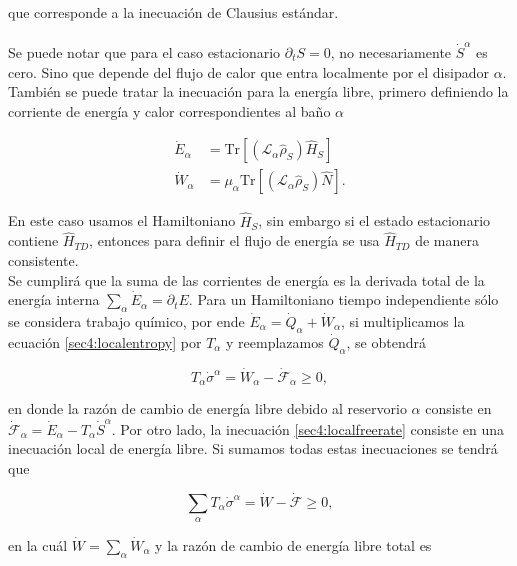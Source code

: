 que corresponde a la inecuación de Clausius estándar.\\
\\
Se puede notar que para el caso estacionario $\partial_{t}S = 0$, no necesariamente $\dot{S}^{\alpha}$ es cero. Sino que depende del flujo de calor que entra localmente por el disipador $\alpha$. También se puede tratar la inecuación para la energía libre, primero definiendo la corriente de energía y calor correspondientes al baño $\alpha$

\begin{align*}
    \dot{E}_{\alpha} & = \text{Tr}[ (\mathcal{L}_{\alpha} \hat{\rho}_{S}) \hat{H}_{S}] \\
    \dot{W}_{\alpha} & = \mu_{\alpha}\text{Tr}[ (\mathcal{L}_{\alpha} \hat{\rho}_{S}) \hat{N}].
\end{align*}

En este caso usamos el Hamiltoniano $\hat{H}_{S}$, sin embargo si el estado estacionario contiene $\hat{H}_{TD}$, entonces para definir el flujo de energía se usa $\hat{H}_{TD}$ de manera consistente.\\
 Se cumplirá que la suma de las corrientes de energía es la derivada total de la energía interna $\sum_{\alpha} \dot{E}_{\alpha} = \partial_{t}E$. Para un Hamiltoniano tiempo independiente sólo se considera trabajo químico, por ende $\dot{E}_{\alpha} = \dot{Q}_{\alpha} + \dot{W}_{\alpha}$, si multiplicamos la ecuación \ref{sec4:localentropy} por $T_{\alpha}$ y reemplazamos $\dot{Q}_{\alpha}$, se obtendrá

\begin{equation}
    T_{\alpha} \dot{\sigma}^{\alpha} = \dot{W}_{\alpha} - \dot{\mathcal{F}}_{\alpha} \geq 0,
\label{sec4:localfreerate}
\end{equation}

en donde la razón de cambio de energía libre debido al reservorio $\alpha$ consiste en $\dot{\mathcal{F}}_{\alpha} = \dot{E}_{\alpha} - T_{\alpha}\dot{S}^{\alpha}$. Por otro lado, la inecuación \ref{sec4:localfreerate} consiste en una inecuación local de energía libre. Si sumamos todas estas inecuaciones se tendrá que

\begin{equation}
    \sum_{\alpha}T_{\alpha} \dot{\sigma}^{\alpha} = \dot{W} - \dot{\mathcal{F}} \geq 0,
\label{sec4:freeratefinal}
\end{equation}

en la cuál $\dot{W} = \sum_{\alpha}\dot{W}_{\alpha}$ y la razón de cambio de energía libre total es


